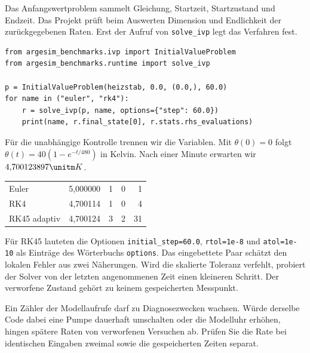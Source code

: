 Das Anfangswertproblem sammelt Gleichung, Startzeit, Startzustand und Endzeit. Das Projekt prüft beim Auswerten Dimension und Endlichkeit der zurückgegebenen Raten. Erst der Aufruf von \texttt{solve\_ivp} legt das Verfahren fest.
{\footnotesize\begin{verbatim}
from argesim_benchmarks.ivp import InitialValueProblem
from argesim_benchmarks.runtime import solve_ivp

p = InitialValueProblem(heizstab, 0.0, (0.0,), 60.0)
for name in ("euler", "rk4"):
    r = solve_ivp(p, name, options={"step": 60.0})
    print(name, r.final_state[0], r.stats.rhs_evaluations)
\end{verbatim}}
Für die unabhängige Kontrolle trennen wir die Variablen. Mit \(\theta(0)=0\) folgt \(\theta(t)=40(1-e^{-t/480})\) in Kelvin. Nach einer Minute erwarten wir \(4{,}700123897\unitm K\).
{\tblstart\begin{tabularx}{\linewidth}{@{}Yrrrr@{}}\toprule
{}&&&&\\\midrule
Euler&5,000000&1&0&1\\
RK4&4,700114&1&0&4\\
RK45 adaptiv&4,700124&3&2&31\\\bottomrule
\end{tabularx}\par}
Für RK45 lauteten die Optionen \texttt{initial\_step=60.0}, \texttt{rtol=1e-8} und \texttt{atol=1e-10} als Einträge des Wörterbuchs \texttt{options}. Das eingebettete Paar schätzt den lokalen Fehler aus zwei Näherungen. Wird die skalierte Toleranz verfehlt, probiert der Solver von der letzten angenommenen Zeit einen kleineren Schritt. Der verworfene Zustand gehört zu keinem gespeicherten Messpunkt.

Ein Zähler der Modellaufrufe darf zu Diagnosezwecken wachsen. Würde derselbe Code dabei eine Pumpe dauerhaft umschalten oder die Modelluhr erhöhen, hingen spätere Raten von verworfenen Versuchen ab. Prüfen Sie die Rate bei identischen Eingaben zweimal sowie die gespeicherten Zeiten separat.

